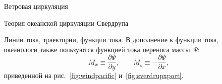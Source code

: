 \begin{chapter}{Ветровая циркуляция}
\begin{section}{Теория океанской циркуляции Свердрупа}
\begin{paragraph}{Линии тока, траектории, функции тока.}
В дополнение к функции тока, океанологи также пользуются функцией
тока переноса массы~$\Psi$:
\begin{equation}\label{eq:11.15}
 M_x \equiv  \frac{\partial{\Psi}}{\partial{y}}, \qquad 
 M_y \equiv -\frac{\partial{\Psi}}{\partial{x}},
\end{equation}
приведенной на рис.~\ref{fig:windpacific} и~\ref{fig:sverdrupxport}.
%
\end{paragraph}
\end{section}


\end{chapter}
